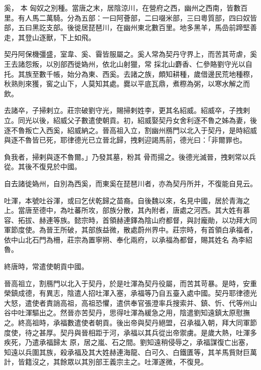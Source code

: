 
\begin{pinyinscope}

 奚，
 本
 匈奴之別種。當唐之末，居陰涼川，在營府之西，幽州之西南，皆數百里。有人馬二萬騎。分為五部：一曰阿薈部，二曰啜米部，三曰粵質部，四曰奴皆部，五曰黑訖支部。後徙居琵琶川，在幽州東北數百里。地多黑羊，馬嵒前蹄堅善走，其登山逐獸，下上如飛。



 契丹阿保機彊盛，室韋、奚、霫皆服屬之。奚人常為契丹守界上，而苦其苛虐，奚王去諸怨叛，以別部西徙媯州，依北山射獵，常
 採北山麝香、仁參賂劉守光以自托。其族至數千帳，始分為東、西奚。去諸之族，頗知耕種，歲借邊民荒地種穄，秋熟則來獲，窖之山下，人莫知其處。爨以平底瓦鼎，煮穄為粥，以寒水解之而飲。



 去諸卒，子掃剌立。莊宗破劉守光，賜掃剌姓李，更其名紹威。紹威卒，子拽剌立。同光以後，紹威父子數遣使朝貢。初，紹威娶契丹女舍利逐不魯之姊為妻，後逐不魯叛亡入西奚，紹威納之。晉高祖入立，割幽州鴈門以北入于契丹，是時紹威與逐不魯皆已死，耶律德光已立晉北歸，拽剌迎謁馬前，德光曰：「非爾罪也。



 負我者，掃剌與逐不魯爾。」乃發其墓，粉其
 骨而揚之。後德光滅晉，拽剌常以兵從。其後不復見於中國。



 自去諸徙媯州，自別為西奚，而東奚在琵琶川者，亦為契丹所并，不復能自見云。



 吐渾，本號吐谷渾，或曰乞伏乾歸之苗裔。自後魏以來，名見中國，居於青海之上。當唐至德中，為吐蕃所攻，部族分散，其內附者，唐處之河西。其大姓有慕容、拓拔、赫連等族。懿宗時，首領赫連鐸為陰山府都督，與討龐勛，以功拜大同軍節度使。為晉王所破，其部族益微，散處蔚州界中。莊宗時，有首領白承福者，依中山北石門為柵，莊宗為置寧朔、奉化兩府，以承福為都督，賜其姓名
 為李紹魯。



 終唐時，常遣使朝貢中國。



 晉高祖立，割鴈門以北入于契丹，於是吐渾為契丹役屬，而苦其苛暴。是時，安重榮鎮成德，有異志，陰遣人招吐渾入塞，承福等乃自五臺入處中國。契丹耶律德光大怒，遣使者責誚高祖，高祖恐懼，遣供奉官張澄率兵搜索并、鎮、忻、代等州山谷中吐渾驅出之。然晉亦苦契丹，思得吐渾為緩急之用，陰遣劉知遠鎮太原慰撫之。終高祖時，承福數遣使者朝貢。後出帝與契丹絕盟，召承福入朝，拜大同軍節度使，待之甚厚。契丹與晉相距于河，承福以其兵從出帝禦虜。是歲大熱，吐渾多疾死，乃遣承福歸太
 原，居之嵐、石之間。劉知遠稍侵辱之，承福謀復亡出塞，知遠以兵圍其族，殺承福及其大姓赫連海龍、白可久、白鐵匱等，其羊馬貲財巨萬計，皆籍沒之，其餘眾以其別部王義宗主之。吐渾遂微，不復見。




\end{pinyinscope}
